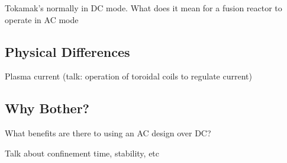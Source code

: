Tokamak's normally in DC mode. What does it mean for a fusion reactor 
to operate in AC mode

\subsection{Physical Differences}

Plasma current (talk: operation of toroidal coils to regulate current)



\subsection{Why Bother?}

What benefits are there to using an AC design over DC?

Talk about confinement time, stability, etc